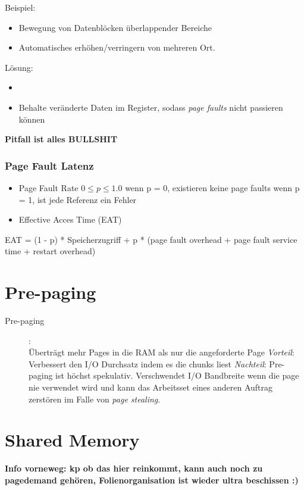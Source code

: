 \documentclass[a4paper]{scrreprt}
\begin{document}
Beispiel:
\begin{itemize}
\item  Bewegung von Datenblöcken überlappender Bereiche
\item Automatisches erhöhen/verringern von mehreren Ort.
\end{itemize}

Lösung:
\begin{itemize}
\item 
\item Behalte veränderte Daten im Register, sodass \textit{page faults} nicht passieren können
\end{itemize}

\begin{huge}
\textbf{Pitfall ist alles BULLSHIT}
\end{huge}

\subsubsection{Page Fault Latenz}
\begin{itemize}
\item Page Fault Rate $0 \leq p \leq 1.0$
\subitem wenn p = 0, existieren keine page faults
\subitem wenn p = 1, ist jede Referenz ein Fehler
\item Effective Acces Time (EAT)
\end{itemize}
EAT = (1 - p) * Speicherzugriff + p * (page fault overhead + page fault service time + restart overhead)

\section{Pre-paging}
\begin{description}
\item[Pre-paging]:\ \\ Überträgt mehr Pages in die RAM als nur die angeforderte Page
\subitem \textit{Vorteil}: Verbessert den I/O Durchsatz indem es die chunks liest
\subitem \textit{Nachteil}: Pre-paging ist höchst spekulativ. Verschwendet I/O Bandbreite wenn die page nie verwendet wird und kann das Arbeitsset eines anderen Auftrag zerstören im Falle von \textit{page stealing}.
\end{description} 

\section{Shared Memory}
\textbf{Info vorneweg: kp ob das hier reinkommt, kann auch noch zu pagedemand gehören, Folienorganisation ist wieder ultra beschissen :)}
\end{document}
